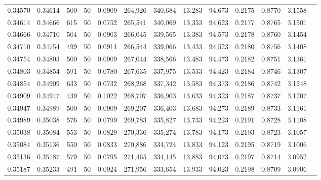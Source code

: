 \begin{tabular}{rrrrrrrrrrrrr}
0.34570 & 0.34614 &   500 &  50 &                                     0.0909 & 264,926 & 340,684 &  13,283 &  94,673 & 0.2175 & 0.8770 & 3.1558 \\
0.34614 & 0.34666 &   615 &  50 &                                     0.0752 & 265,541 & 340,069 &  13,333 &  94,623 & 0.2177 & 0.8765 & 3.1501 \\
0.34666 & 0.34710 &   504 &  50 &                                     0.0903 & 266,045 & 339,565 &  13,383 &  94,573 & 0.2178 & 0.8760 & 3.1454 \\
0.34710 & 0.34754 &   499 &  50 &                                     0.0911 & 266,544 & 339,066 &  13,433 &  94,523 & 0.2180 & 0.8756 & 3.1408 \\
0.34754 & 0.34803 &   500 &  50 &                                     0.0909 & 267,044 & 338,566 &  13,483 &  94,473 & 0.2182 & 0.8751 & 3.1361 \\
0.34803 & 0.34854 &   591 &  50 &                                     0.0780 & 267,635 & 337,975 &  13,533 &  94,423 & 0.2184 & 0.8746 & 3.1307 \\
0.34854 & 0.34909 &   633 &  50 &                                     0.0732 & 268,268 & 337,342 &  13,583 &  94,373 & 0.2186 & 0.8742 & 3.1248 \\
0.34909 & 0.34947 &   439 &  50 &                                     0.1022 & 268,707 & 336,903 &  13,633 &  94,323 & 0.2187 & 0.8737 & 3.1207 \\
0.34947 & 0.34989 &   500 &  50 &                                     0.0909 & 269,207 & 336,403 &  13,683 &  94,273 & 0.2189 & 0.8733 & 3.1161 \\
0.34989 & 0.35038 &   576 &  50 &                                     0.0799 & 269,783 & 335,827 &  13,733 &  94,223 & 0.2191 & 0.8728 & 3.1108 \\
0.35038 & 0.35084 &   553 &  50 &                                     0.0829 & 270,336 & 335,274 &  13,783 &  94,173 & 0.2193 & 0.8723 & 3.1057 \\
0.35084 & 0.35136 &   550 &  50 &                                     0.0833 & 270,886 & 334,724 &  13,833 &  94,123 & 0.2195 & 0.8719 & 3.1006 \\
0.35136 & 0.35187 &   579 &  50 &                                     0.0795 & 271,465 & 334,145 &  13,883 &  94,073 & 0.2197 & 0.8714 & 3.0952 \\
0.35187 & 0.35233 &   491 &  50 &                                     0.0924 & 271,956 & 333,654 &  13,933 &  94,023 & 0.2198 & 0.8709 & 3.0906 \\

\end{tabular}

